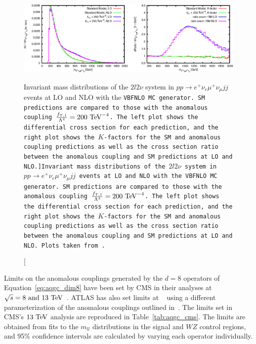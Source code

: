 \begin{figure}
  \centering
  \includegraphics[width=.95\textwidth]{figs/ssww_13tev/extensions/aqgc}
  \caption[Invariant mass distributions of the $2l2\nu$ system in $pp\rightarrow e^{+}\nu_{e}\mu^{+}\nu_{\mu}jj$ events at LO and NLO with the \tt{VBFNLO} MC generator.  SM predictions are compared to those with the anomalous coupling $\frac{f_{T,1}}{\Lambda^4} = 200\tev^{-4}$.  The left plot shows the differential cross section for each prediction, and the right plot shows the $K$-factors for the SM and anomalous coupling predictions as well as the cross section ratio between the anomalous coupling and SM predictions at LO and NLO.]{Invariant mass distributions of the $2l2\nu$ system in $pp\rightarrow e^{+}\nu_{e}\mu^{+}\nu_{\mu}jj$ events at LO and NLO with the \tt{VBFNLO} MC generator.  SM predictions are compared to those with the anomalous coupling $\frac{f_{T,1}}{\Lambda^4} = 200\tev^{-4}$.  The left plot shows the differential cross section for each prediction, and the right plot shows the $K$-factors for the SM and anomalous coupling predictions as well as the cross section ratio between the anomalous coupling and SM predictions at LO and NLO.  Plots taken from~\cite{2013.aqgc-mc}.}
  \label{fig:ssww13tev_aqgc}
\end{figure}

Limits on the anomalous couplings generated by the $d=8$ operators of Equation~\ref{eq:aqgc_dim8} have been set by CMS in their \ssww analyses at $\sqrt{s} = 8\textrm{\ and\ }13\tev$~\cite{2015.ssww-8tev-cms, 2017.ssww-13tev-cms}.
ATLAS has also set limits at ~\cite{2014.ssww-8tev-atlas} using a different parameterization of the anomalous couplings outlined in~\cite{2013.aqgc-alpha}.
The limits set in CMS's $13\tev$ analysis are reproduced in Table~\ref{tab:aqgc_cms}.
The limits are obtained from fits to the $m_{ll}$ distributions in the signal and $WZ$ control regions, and 95\% confidence intervals are calculated by varying each operator individually.

